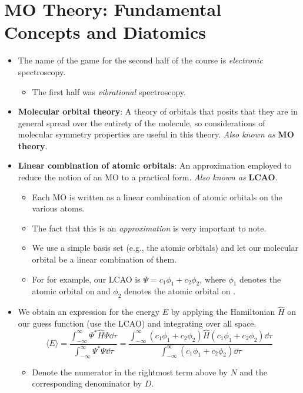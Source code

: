 \documentclass[../notes.tex]{subfiles}
\begin{document}
\section{MO Theory: Fundamental Concepts and Diatomics}
\begin{itemize}
    \item {}The name of the game for the second half of the course is \emph{electronic} spectroscopy.
    \begin{itemize}
        \item The first half was \emph{vibrational} spectroscopy.
    \end{itemize}
    \item \textbf{Molecular orbital theory}: A theory of orbitals that posits that they are in general spread over the entirety of the molecule, so considerations of molecular symmetry properties are useful in this theory. \emph{Also known as} \textbf{MO theory}.
    \item \textbf{Linear combination of atomic orbitals}: An approximation employed to reduce the notion of an MO to a practical form. \emph{Also known as} \textbf{LCAO}.
    \begin{itemize}
        \item Each MO is written as a linear combination of atomic orbitals on the various atoms.
        \item The fact that this is an \emph{approximation} is very important to note.
        \item We use a simple basis set (e.g., the atomic orbitals) and let our molecular orbital be a linear combination of them.
        \item For  for example, our LCAO is $\Psi=c_1\phi_1+c_2\phi_2$, where $\phi_1$ denotes the atomic orbital on  and $\phi_2$ denotes the atomic orbital on .
    \end{itemize}
    \item We obtain an expression for the energy $E$ by applying the Hamiltonian $\hat{H}$ on our guess function (use the LCAO) and integrating over all space.
    \begin{equation*}
        \langle E\rangle = \frac{\int_{-\infty}^\infty\Psi^*\hat{H}\Psi\dd\tau}{\int_{-\infty}^\infty\Psi^*\Psi\dd\tau}
        = \frac{\int_{-\infty}^\infty(c_1\phi_1+c_2\phi_2)\hat{H}(c_1\phi_1+c_2\phi_2)\dd\tau}{\int_{-\infty}^\infty(c_1\phi_1+c_2\phi_2)\dd\tau}
    \end{equation*}
    \begin{itemize}
        \item Denote the numerator in the rightmost term above by $N$ and the corresponding denominator by $D$.

\end{itemize}
\end{itemize}
\end{document}
